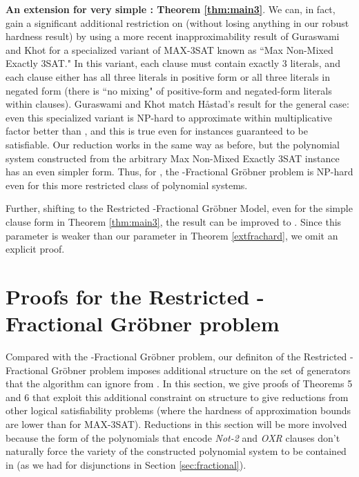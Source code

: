 \documentclass{article}
\begin{document}
\noindent\textbf{An extension for very simple : Theorem \ref{thm:main3}}. 
We can, in fact, gain a significant additional restriction on  (without losing anything in our robust hardness result) by using a more recent inapproximability result of Guraswami and Khot \cite{guruswamikhot} for a specialized variant of MAX\nobreakdash-3SAT known as ``Max Non-Mixed Exactly 3SAT." In this variant, each clause must contain exactly 3 literals, and each clause either has all three literals in positive form or all three literals in negated form (there is ``no mixing" of positive-form and negated-form literals within clauses). Guraswami and Khot match H{\aa}stad's result for the general case: even this specialized variant is NP-hard to approximate within multiplicative factor better than , and this is true even for instances guaranteed to be satisfiable. Our reduction works in the same way as before, but the polynomial system constructed from the arbitrary Max Non-Mixed Exactly 3SAT instance has an even simpler form. Thus, for , the \nobreakdash-Fractional Gr\"{o}bner problem is NP-hard even for this more restricted class of polynomial systems.

Further,  shifting to the Restricted \nobreakdash-Fractional Gr\"{o}bner Model, even for the simple clause form in Theorem \ref{thm:main3}, the result can be improved to . Since this parameter is weaker than our parameter in Theorem \ref{extfrachard}, we omit an explicit proof. 

\section{Proofs for the Restricted \nobreakdash-Fractional Gr\"{o}bner problem}
\label{sec:restricted}

Compared with the \nobreakdash-Fractional Gr\"{o}bner problem, our definiton of the  Restricted \nobreakdash-Fractional Gr\"{o}bner problem  imposes additional structure on the set of generators that the algorithm can ignore from . In this section, we give proofs of Theorems 5 and 6 that exploit this additional constraint on structure to give reductions from other logical satisfiability problems (where the hardness of approximation bounds are lower than for MAX-3SAT). 
Reductions in this section will be more involved because the form of the polynomials that encode \textit{Not-2} and \textit{OXR} clauses don't naturally force the variety of the constructed polynomial system to be contained in  (as we had for disjunctions in Section \ref{sec:fractional}). 
\end{document}
